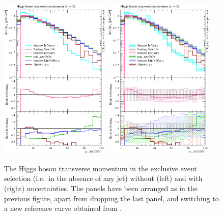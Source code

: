 \begin{figure}[t!]
  \centering
  \includegraphics[width=0.47\textwidth]{figures/hjetscomp_u_H_pT_excl.pdf}
  \hfill
  \includegraphics[width=0.47\textwidth]{figures/hjetscomp_H_pT_excl.pdf}
  \caption{\label{fig:hjetscomp:results:exclobs:hpt}%
    The Higgs boson transverse momentum in the exclusive event
    selection (i.e.~in the absence of any jet) without (left) and with
    (right) uncertainties. The  panels have been arranged as in
    the previous figure, apart from dropping the last panel,  and
    switching to a new reference curve  obtained from
    \hjetscompPowheg \hjetscompNNLOPS.}
\end{figure}

